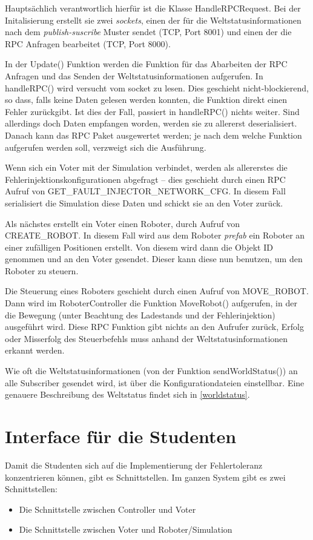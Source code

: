 Haupts{\"{a}}chlich verantwortlich hierf{\"{u}}r ist die Klasse HandleRPCRequest. Bei der Initalisierung erstellt sie zwei \textit{sockets}, einen der f{\"{u}}r
die Weltstatusinformationen nach dem \textit{publish-suscribe} Muster sendet (TCP, Port 8001) und einen der die RPC Anfragen bearbeitet (TCP, Port 8000).

In der Update() Funktion werden die Funktion f{\"{u}}r das Abarbeiten der RPC Anfragen und das Senden der Weltstatusinformationen aufgerufen. In handleRPC()
wird versucht vom socket zu lesen. Dies geschieht nicht-blockierend, so dass, falls keine Daten gelesen werden konnten, die Funktion direkt einen Fehler
zur{\"{u}}ckgibt. Ist dies der Fall, passiert in handleRPC() nichts weiter. Sind allerdings doch Daten empfangen worden, werden sie zu allererst deserialisiert.
Danach kann das RPC Paket ausgewertet werden; je nach dem welche Funktion aufgerufen werden soll, verzweigt sich die Ausf{\"{u}}hrung.

Wenn sich ein Voter mit der Simulation verbindet, werden als allererstes die Fehlerinjektionskonfigurationen abgefragt -- dies geschieht durch einen RPC Aufruf
von GET\_FAULT\_INJECTOR\_NETWORK\_CFG. In diesem Fall serialisiert die Simulation diese Daten und schickt sie an den Voter zur{\"{u}}ck.

Als n{\"{a}}chstes erstellt ein Voter einen Roboter, durch Aufruf von CREATE\_ROBOT. In diesem Fall wird aus dem Roboter \textit{prefab} ein Roboter an einer
zuf{\"{a}}lligen Positionen erstellt. Von diesem wird dann die Objekt ID genommen und an den Voter gesendet. Dieser kann diese nun benutzen, um den Roboter zu
steuern.

Die Steuerung eines Roboters geschieht durch einen Aufruf von MOVE\_ROBOT. Dann wird im RoboterController die Funktion MoveRobot() aufgerufen, in der die
Bewegung (unter Beachtung des Ladestands und der Fehlerinjektion) ausgef{\"{u}}hrt wird. Diese RPC Funktion gibt nichts an den Aufrufer zur{\"{u}}ck, Erfolg
oder Misserfolg des Steuerbefehls muss anhand der Weltstatusinformationen erkannt werden.

Wie oft die Weltstatusinformationen (von der Funktion sendWorldStatus()) an alle Subscriber gesendet wird, ist {\"{u}}ber die Konfigurationdateien
einstellbar. Eine genauere Beschreibung des Weltstatus findet sich in \ref{worldstatus}.

\clearpage
\section{Interface f{\"{u}}r die Studenten}\label{interface}
Damit die Studenten sich auf die Implementierung der Fehlertoleranz konzentrieren k{\"{o}}nnen, gibt es Schnittstellen.
Im ganzen System gibt es zwei Schnittstellen:
\begin{itemize}
\item Die Schnittstelle zwischen Controller und Voter
\item Die Schnittstelle zwischen Voter und Roboter/Simulation
\end{itemize}

